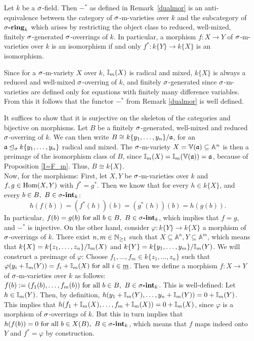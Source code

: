 \begin{prop}\label{dualisequiv}
Let $k$ be a $\sigma$-field. Then $-^*$ as defined in Remark~\ref{dualmor} is an anti-equivalence between the category of $\sigma$-m-varieties over $k$ and the subcategory of $\sigma\text{{\normalfont\textbf{-ring}}}_k$ which arises by restricting the object class to reduced, well-mixed, finitely $\sigma$-generated $\sigma$-overrings of $k$. 
In particular, a morphism $f: X \rightarrow Y$ of $\sigma$-m-varieties over $k$ is an isomorphism if and only $f^*: k\{Y\} \rightarrow k\{X\}$ is an isomorphism.
\begin{bew}
Since for a $\sigma$-m-variety $X$ over $k$, $\mathbb{I}_m(X)$ is radical and mixed, $k\{X\}$ is always a reduced and well-mixed $\sigma$-overring of $k$, 
and finitely $\sigma$-generated since $\sigma$-m-varieties are defined only for equations with finitely many difference variables. From this it follows that the functor $-^*$ from Remark \ref{dualmor} is well defined. 

It suffices to show that it is surjective on the skeleton of the categories and bijective on morphisms. 
Let $B$ be a finitely $\sigma$-generated, well-mixed and reduced $\sigma$-overring of $k$. We can then write $B \cong k\{y_1,\ldots,y_n\}/\mathfrak{a}$, for an $\mathfrak{a} \unlhd_{\sigma} k\{y_1,\ldots,y_n\}$ radical and mixed. The $\sigma$-m-variety $X = \mathbb{V}(\mathfrak{a}) \subseteq \mathbb{A}^n$
is then a preimage of the isomorphism class of $B$, since $\mathbb{I}_m(X) = \mathbb{I}_m(\mathbb{V}(\mathfrak{a})) = \mathfrak{a}$, because of Proposition \ref{I=F_m}. Thus, $B \cong k\{X\}$. \\
\indent Now, for the morphisms: First, let $X,Y$ be $\sigma$-m-varieties over $k$ and $f,g \in \text{Hom}(X,Y)$ with $f^* = g^*$. Then we know that for every $h \in k\{X\}$, and every $b \in B, ~ B \in \sigma\text{{\normalfont\textbf{-int}}}_k$:
\[ h(f(b)) = (f^*(h))(b) = (g^*(h))(b) = h(g(b)). \]
In particular, $f(b) = g(b) \text{ for all } b \in B, ~ B \in \sigma\text{{\normalfont\textbf{-int}}}_k$, which implies that $f = g$, and $-^*$ is injective. 
On the other hand, consider $\varphi: k\{Y\} \rightarrow k\{X\}$ a morphism of $\sigma$-overrings of $k$. There exist $n,m \in \mathbb{N}_{\geq1}$ such that $X \subseteq \mathbb{A}^n, Y \subseteq \mathbb{A}^m$,
 which means that $k\{X\} = k\{z_1,\ldots,z_n\}/\mathbb{I}_m(X)$ and $k\{Y\} = k\{y_1,\ldots,y_m\}/\mathbb{I}_m(Y)$. We will construct a preimage of $\varphi$: Choose $f_1,\ldots,f_m \in k\{z_1,\ldots,z_n\}$ such that $\varphi(y_i + \mathbb{I}_m(Y)) = f_i + \mathbb{I}_m(X) \text{ for all } i \in \underline{m}$.
Then we define a morphism $f: X \rightarrow Y$ of $\sigma$-m-varieties over $k$ as follows: $f(b) := (f_1(b),\ldots,f_m(b)) \text{ for all } b \in B, ~ B \in \sigma\text{{\normalfont\textbf{-int}}}_k$. This is well-defined: Let $h \in \mathbb{I}_m(Y)$. Then, by definition, $h(y_1 + \mathbb{I}_m(Y),\ldots,y_n + \mathbb{I}_m(Y)) = 0 + \mathbb{I}_m(Y)$.
This implies that $h(f_1 + \mathbb{I}_m(X),\ldots,f_m + \mathbb{I}_m(X)) = 0 + \mathbb{I}_m(X)$, since $\varphi$ is a morphism of $\sigma$-overrings of $k$. But this in turn implies that $h(f(b)) = 0 \text{ for all } b \in X(B), ~ B \in \sigma\text{{\normalfont\textbf{-int}}}_k$, which means that $f$ maps indeed onto $Y$ and $f^* = \varphi$ by construction.
\end{bew}
\end{prop}


